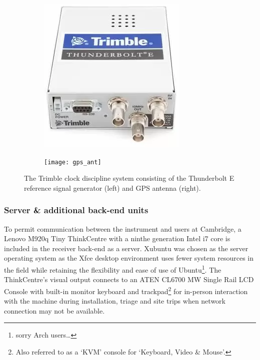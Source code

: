 \begin{figure}
    \centering
    \centering
    \begin{subfigure}{.3\textwidth}
        \centering
        \includegraphics[width=\linewidth]{trimble}
    \end{subfigure}
    \hspace{.15\textwidth}
    \begin{subfigure}{.33\textwidth}
    \centering
        \texttt{[image: gps\_ant]}
    \end{subfigure}
    \caption{The Trimble clock discipline system consisting of the Thunderbolt E reference signal generator (left) and GPS antenna (right).}
    \label{fig:gps}
\end{figure}


\subsubsection{Server \& additional back-end units}
To permit communication between the instrument and users at Cambridge, a Lenovo M920q Tiny ThinkCentre with a ninthe generation Intel i7 core is included in the receiver back-end as a server. Xubuntu was chosen as the server operating system as the Xfce desktop environment uses fewer system resources in the field while retaining the flexibility and ease of use of Ubuntu\footnote{sorry Arch users…}. The ThinkCentre’s visual output connects to an ATEN CL6700 MW Single Rail LCD Console with built-in monitor keyboard and trackpad\footnote{Also referred to as a ‘KVM’ console for ‘Keyboard, Video \& Mouse’.} for in-person interaction with the machine during installation, triage and site trips when network connection may not be available.

